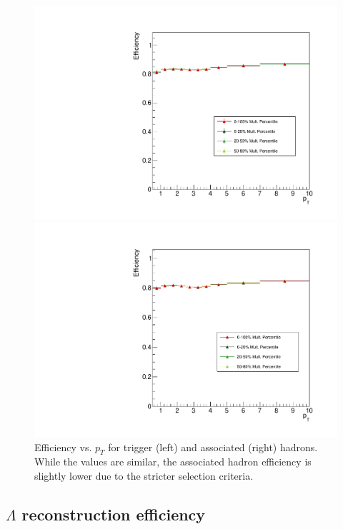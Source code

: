 \begin{figure}[h]
	\centering
	\begin{minipage}{0.48\textwidth}
		\includegraphics[width=\textwidth]{figures/analysis/trigger_efficiency.pdf}
	\end{minipage}
	\begin{minipage}{0.48\textwidth}
		\includegraphics[width=\textwidth]{figures/analysis/associated_efficiency.pdf}
	\end{minipage}
	\caption{Efficiency vs. $p_T$ for trigger (left) and associated (right) hadrons. While the values are similar, the associated hadron efficiency is slightly lower due to the stricter selection criteria.}
	\label{fig:trigassoc_eff_pt}
\end{figure}

\subsection{$\Lambda$ reconstruction efficiency}

